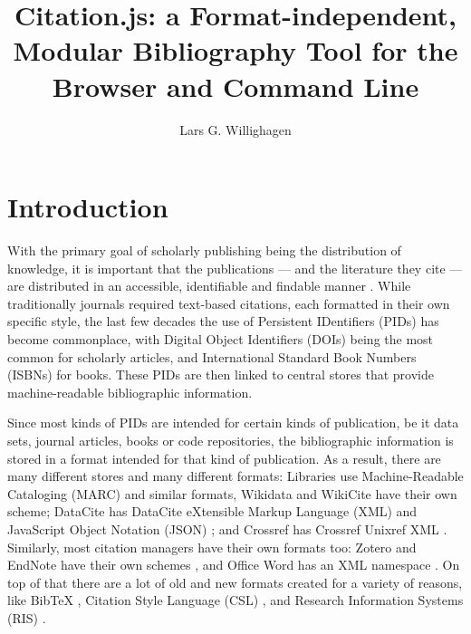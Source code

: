 \documentclass[fleqn,10pt,lineno]{wlpeerj} %
\title{Citation.js: a Format-independent, Modular Bibliography Tool for the Browser and Command Line}
\author[1]{Lars G. Willighagen}
\affil[1]{Eindhoven, The Netherlands}
\begin{document}
\flushbottom
\maketitle
\thispagestyle{empty}

\section*{Introduction}

With the primary goal of scholarly publishing being the distribution of knowledge, it is important that the publications --- and the literature they cite --- are distributed in an accessible, identifiable and findable manner \citep{shotton_publishing:_2013}. While traditionally journals required text-based citations, each formatted in their own specific style, the last few decades the use of Persistent IDentifiers (PIDs) has become commonplace, with Digital Object Identifiers (DOIs) being the most common for scholarly articles, and International Standard Book Numbers (ISBNs) for books. These PIDs are then linked to central stores that provide machine-readable bibliographic information.

Since most kinds of PIDs are intended for certain kinds of publication, be it data sets, journal articles, books or code repositories, the bibliographic information is stored in a format intended for that kind of publication. As a result, there are many different stores and many different formats: Libraries use Machine-Readable Cataloging (MARC) \citep{avram_machine-readable_nodate} and similar formats, Wikidata \citep{vrandecic_getting_2018} and WikiCite \citep{taraborelli_wikicite_2017} have their own scheme; DataCite has DataCite eXtensible Markup Language (XML) and JavaScript Object Notation (JSON) \citep{noauthor_datacite_2017}; and Crossref has Crossref Unixref XML \citep{noauthor_unixref_nodate}. Similarly, most citation managers have their own formats too: Zotero and EndNote have their own schemes \citep{vinckevicius_zotero_2017,noauthor_endnote_nodate}, and Office Word has an XML namespace \citep{noauthor_documentformat.openxml.bibliography_nodate}. On top of that there are a lot of old and new formats created for a variety of reasons, like BibTeX \citep{patashnik_bibtexing_1988}, Citation Style Language (CSL) \citep{zelle_csl_2012}, and Research Information Systems (RIS) \citep{noauthor_ris_2012}.
\end{document}
